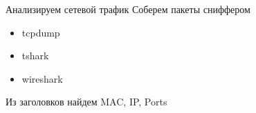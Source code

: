 
\begin{frame}{Анализируем сетевой трафик}
Соберем пакеты сниффером
	\begin{itemize}
		\item tcpdump
		\item tshark 
		\item wireshark
	\end{itemize}
Из заголовков найдем MAC, IP, Ports
\end{frame}